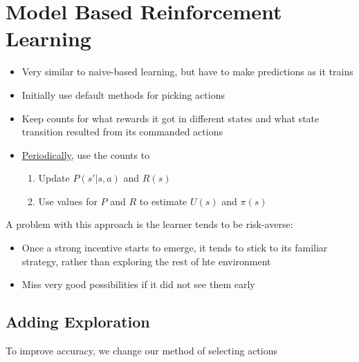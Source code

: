 \section{Model Based Reinforcement Learning}

  \begin{itemize}
    \item Very similar to naive-based learning, but have to make predictions
    as it trains
    \item Initially use default methods for picking actions
    \item Keep counts for what rewards it got in different states and what
    state transition resulted from its commanded actions
    \item \ul{Periodically}, use the counts to
    \begin{enumerate}
      \item Update $ P\left( s' | s, a \right) $ and $ R\left( s \right) $
      \item Use values for $ P $ and $ R $ to estimate $ U\left( s \right) $
      and $ \pi\left( s \right) $
    \end{enumerate}
  \end{itemize}

  A problem with this approach is the learner tends to be risk-averse:

  \begin{itemize}
    \item Once a strong incentive starts to emerge, it tends to stick to its
    familiar strategy, rather than exploring the rest of hte environment
    \item Miss very good possibilities if it did not see them early
  \end{itemize}

  \subsection{Adding Exploration}

    To improve accuracy, we change our method of selecting actions

